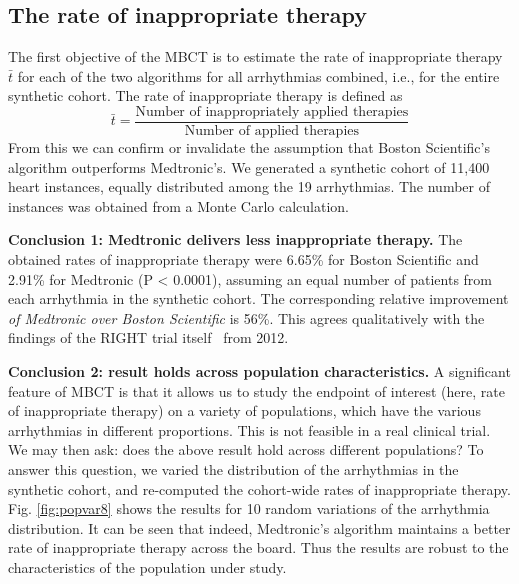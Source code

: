 \subsection{The rate of inappropriate therapy}
\label{sec:rate inapp}
The first objective of the MBCT is to estimate the rate of inappropriate therapy $\bar{t}$ for each of the two algorithms for all arrhythmias combined, i.e., for the entire synthetic cohort.
The rate of inappropriate therapy is defined as
\[\bar{t} = \frac{\text{Number of inappropriately applied therapies}}{\text{Number of applied therapies}}\]
From this we can confirm or invalidate the assumption that Boston Scientific's algorithm outperforms Medtronic's.
We generated a synthetic cohort of 11,400 heart instances, equally distributed among the 19 arrhythmias.
The number of instances was obtained from a Monte Carlo calculation.%

\textbf{Conclusion 1: Medtronic delivers less inappropriate therapy.}
The obtained rates of inappropriate therapy were 6.65\% for Boston Scientific and 2.91\% for Medtronic (P < 0.0001), assuming an equal number of patients from each arrhythmia in the synthetic cohort.
The corresponding relative improvement \emph{of Medtronic over Boston Scientific} is 56\%.
This agrees qualitatively with the findings of the RIGHT trial itself~\cite{GoldABBTB11_RIGHTresults} from 2012.

\textbf{Conclusion 2: result holds across population characteristics.}
A significant feature of MBCT is that it allows us to study the endpoint of interest (here, rate of inappropriate therapy) on a variety of populations, which have the various arrhythmias in different proportions.
This is not feasible in a real clinical trial.
We may then ask: does the above result hold across different populations?
To answer this question, we varied the distribution of the arrhythmias in the synthetic cohort, and re-computed the cohort-wide rates of inappropriate therapy.
Fig. \ref{fig:popvar8} shows the results for 10 random variations of the arrhythmia distribution.
It can be seen that indeed, Medtronic's algorithm maintains a better rate of inappropriate therapy across the board.
Thus the results are robust to the characteristics of the population under study.

